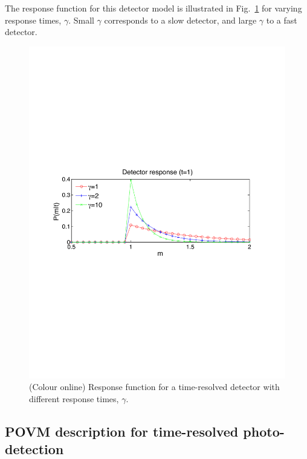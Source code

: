 \documentclass[aps,pra,twocolumn,amsmath,amssymb,color,superscriptaddress]{revtex4}
\begin{document}
The response function for this detector model is illustrated in Fig.~\ref{fig:detector_response} for varying response times, $\gamma$. Small $\gamma$ corresponds to a slow detector, and large $\gamma$ to a fast detector.
\begin{figure}[!htb]
\includegraphics[width=\columnwidth]{figures/detector_response}
\caption{(Colour online) Response function for a time-resolved detector with different response times, $\gamma$.} \label{fig:detector_response}
\end{figure}

%
%

\subsection{POVM description for time-resolved photo-detection}
\end{document}
